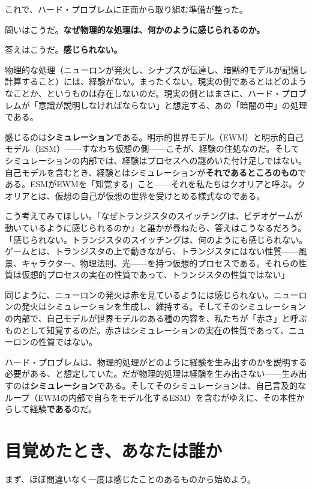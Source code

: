 \documentclass[11pt, twoside, openright]{book}
\begin{document}
これで、ハード・プロブレムに正面から取り組む準備が整った。

問いはこうだ。\textbf{なぜ物理的な処理は、何かのように感じられるのか。}

答えはこうだ。\textbf{感じられない。}

物理的な処理（ニューロンが発火し、シナプスが伝達し、暗黙的モデルが記憶し計算すること）には、経験がない。まったくない。現実の側であるとはどのようなことか、というものは存在しないのだ。現実の側とはまさに、ハード・プロブレムが「意識が説明しなければならない」と想定する、あの「暗闇の中」の処理である。

感じるのは\textbf{シミュレーション}である。明示的世界モデル（EWM）と明示的自己モデル（ESM）------すなわち仮想の側------こそが、経験の住処なのだ。そしてシミュレーションの内部では、経験はプロセスへの謎めいた付け足しではない。自己モデルを含むとき、経験とはシミュレーションが\textbf{それであるところのもの}である。ESMがEWMを「知覚する」こと------それを私たちはクオリアと呼ぶ。クオリアとは、仮想の自己が仮想の世界を受けとめる様式なのである。

こう考えてみてほしい。「なぜトランジスタのスイッチングは、ビデオゲームが動いているように感じられるのか」と誰かが尋ねたら、答えはこうなるだろう。「感じられない。トランジスタのスイッチングは、何のようにも感じられない。ゲームとは、トランジスタの上で動きながら、トランジスタにはない性質------風景、キャラクター、物理法則、光------を持つ仮想的プロセスである。それらの性質は仮想的プロセスの実在の性質であって、トランジスタの性質ではない」

同じように、ニューロンの発火は赤を見ているようには感じられない。ニューロンの発火はシミュレーションを生成し、維持する。そしてそのシミュレーションの内部で、自己モデルが世界モデルのある種の内容を、私たちが「赤さ」と呼ぶものとして知覚するのだ。赤さはシミュレーションの実在の性質であって、ニューロンの性質ではない。

ハード・プロブレムは、物理的処理がどのように経験を生み出すのかを説明する必要がある、と想定していた。だが物理的処理は経験を生み出さない------生み出すのは\textbf{シミュレーション}である。そしてそのシミュレーションは、自己言及的なループ（EWMの内部で自らをモデル化するESM）を含むがゆえに、その本性からして経験\textbf{である}のだ。

\section*{目覚めたとき、あなたは誰か}

まず、ほぼ間違いなく一度は感じたことのあるものから始めよう。
\end{document}
